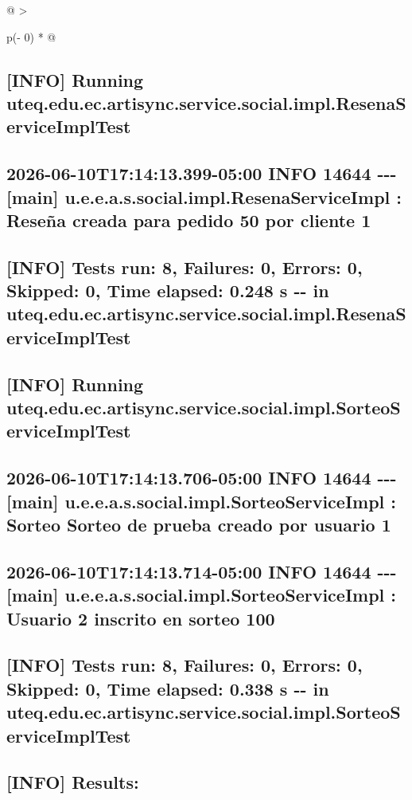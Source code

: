\documentclass[
]{article}
\begin{document}
\begin{longtable}[]{@{}
  >{\raggedright\arraybackslash}p{(\columnwidth - 0\tabcolsep) * }@{}}
\begin{minipage}[b]{\linewidth}
\subsection{{[}INFO{]} Running
uteq.edu.ec.artisync.service.social.impl.ResenaServiceImplTest}

\subsection{2026-06-10T17:14:13.399-05:00 INFO 14644 -\/-\/- {[}main{]}
u.e.e.a.s.social.impl.ResenaServiceImpl : Reseña creada para pedido 50
por cliente
1}

\subsection{{[}INFO{]} Tests run: 8, Failures: 0, Errors: 0, Skipped: 0,
Time elapsed: 0.248 s -\/- in
uteq.edu.ec.artisync.service.social.impl.ResenaServiceImplTest}

\subsection{{[}INFO{]} Running
uteq.edu.ec.artisync.service.social.impl.SorteoServiceImplTest}

\subsection{2026-06-10T17:14:13.706-05:00 INFO 14644 -\/-\/- {[}main{]}
u.e.e.a.s.social.impl.SorteoServiceImpl : Sorteo \textquotesingle Sorteo
de prueba\textquotesingle{} creado por usuario
1}

\subsection{\texorpdfstring{2026-06-10T17:14:13.714-05:00 INFO 14644
-\/-\/- {[}main{]} u.e.e.a.s.social.impl.SorteoServiceImpl : Usuario 2
inscrito en sorteo 100
}{2026-06-10T17:14:13.714-05:00 INFO 14644 -\/-\/- {[}main{]} u.e.e.a.s.social.impl.SorteoServiceImpl : Usuario 2 inscrito en sorteo 100 }}

\subsection{{[}INFO{]} Tests run: 8, Failures: 0, Errors: 0, Skipped: 0,
Time elapsed: 0.338 s -\/- in
uteq.edu.ec.artisync.service.social.impl.SorteoServiceImplTest}

\subsection{{[}INFO{]} Results:}


\end{minipage}
\end{longtable}
\end{document}
